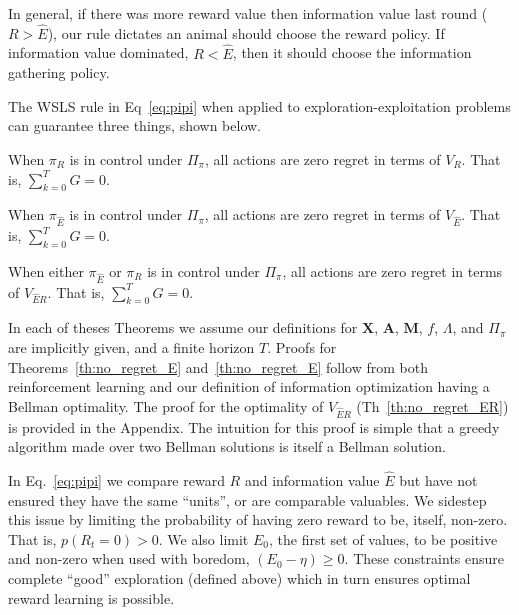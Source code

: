 In general, if there was more reward value then information value last round ($R > \hat E$), our rule dictates an animal should choose the reward policy. If information value dominated, $R < \hat E$, then it should choose the information gathering policy.

The WSLS rule in Eq~\ref{eq:pipi} when applied to exploration-exploitation problems can guarantee three things, shown below. 

\begin{theorem}
	\label{th:no_regret_R}
	When $\pi_R$ is in control under $\Pi_{\pi}$, all actions are zero regret in terms of $V_R$. That is, $\sum_{k=0}^{T} G = 0$.
\end{theorem}

\begin{theorem}
	\label{th:no_regret_E}
	When $\pi_{\hat E}$ is in control under $\Pi_{\pi}$, all actions are zero regret in terms of $V_{\hat E}$. That is, $\sum_{k=0}^{T} G = 0$.
\end{theorem}

\begin{theorem}
	\label{th:no_regret_ER}
	When either $\pi_{\hat E}$ or $\pi_R$ is in control under $\Pi_{\pi}$, all actions are zero regret in terms of $V_{\hat{E}R}$. That is, $\sum_{k=0}^{T} G = 0$.
\end{theorem}

In each of theses Theorems we assume our definitions for $\mathbf{X}$, $\mathbf{A}$, $\mathbf{M}$, $f$, $\Lambda$, and $\Pi_{\pi}$ are implicitly given, and a finite horizon $T$. Proofs for Theorems~\ref{th:no_regret_E} and~\ref{th:no_regret_E} follow from both reinforcement learning and our definition of information optimization having a Bellman optimality. The proof for the optimality of $V_{\hat{E}R}$ (Th~\ref{th:no_regret_ER}) is provided in the Appendix. The intuition for this proof is simple that a greedy algorithm made over two Bellman solutions is itself a Bellman solution.

In Eq.~\ref{eq:pipi} we compare reward $R$ and information value $\hat E$ but have not ensured they have the same ``units'', or are comparable valuables. We sidestep this issue by limiting the probability of having zero reward to be, itself, non-zero. That is, $p(R_t=0) > 0$. We also limit $E_0$, the first set of values, to be positive and non-zero when used with boredom, $(E_0 - \eta) \geq 0$. These constraints ensure complete ``good'' exploration (defined above) which in turn ensures optimal reward learning is possible.


